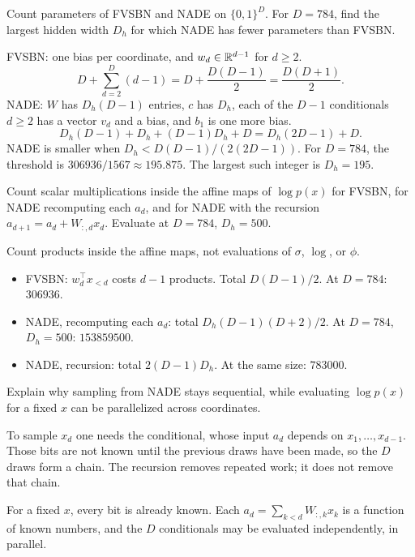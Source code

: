 \begin{hwqbox}
Count parameters of FVSBN and NADE on $\{0,1\}^D$. For $D=784$, find the largest hidden width $D_h$ for which NADE has fewer parameters than FVSBN.
\end{hwqbox}
\begin{hwsolbox}
FVSBN: one bias per coordinate, and $w_d\in\mathbb{R}^{d-1}$ for $d\ge 2$.
\[
D+\sum_{d=2}^D(d-1)=D+\frac{D(D-1)}{2}=\frac{D(D+1)}{2}.
\]
NADE: $W$ has $D_h(D-1)$ entries, $c$ has $D_h$, each of the $D-1$ conditionals $d\ge 2$ has a vector $v_d$ and a bias, and $b_1$ is one more bias.
\[
D_h(D-1)+D_h+(D-1)D_h+D=D_h(2D-1)+D.
\]
NADE is smaller when $D_h<D(D-1)/(2(2D-1))$. For $D=784$, the threshold is $306936/1567\approx 195.875$. The largest such integer is $D_h=195$.
\end{hwsolbox}

\begin{hwqbox}
Count scalar multiplications inside the affine maps of $\log p(x)$ for FVSBN, for NADE recomputing each $a_d$, and for NADE with the recursion $a_{d+1}=a_d+W_{:,d}x_d$. Evaluate at $D=784$, $D_h=500$.
\end{hwqbox}
\begin{hwsolbox}
Count products inside the affine maps, not evaluations of $\sigma$, $\log$, or $\phi$.
\begin{itemize}
\item FVSBN: $w_d^\top x_{<d}$ costs $d-1$ products. Total $D(D-1)/2$. At $D=784$: $306936$.
\item NADE, recomputing each $a_d$: total $D_h(D-1)(D+2)/2$. At $D=784$, $D_h=500$: $153859500$.
\item NADE, recursion: total $2(D-1)D_h$. At the same size: $783000$.
\end{itemize}
\end{hwsolbox}

\begin{hwqbox}
Explain why sampling from NADE stays sequential, while evaluating $\log p(x)$ for a fixed $x$ can be parallelized across coordinates.
\end{hwqbox}
\begin{hwsolbox}
To sample $x_d$ one needs the conditional, whose input $a_d$ depends on $x_1,\ldots,x_{d-1}$. Those bits are not known until the previous draws have been made, so the $D$ draws form a chain. The recursion removes repeated work; it does not remove that chain.

For a fixed $x$, every bit is already known. Each $a_d=\sum_{k<d}W_{:,k}x_k$ is a function of known numbers, and the $D$ conditionals may be evaluated independently, in parallel.
\end{hwsolbox}

